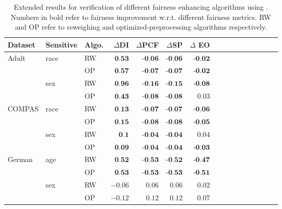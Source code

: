 	\begin{table}[!t]
	
	\centering
	\small
	\caption{Extended results for verification of different fairness enhancing algorithms using {\framework}. Numbers in bold refer to fairness improvement w.r.t. different fairness metrics. RW and OP refer to reweighing and optimized-preprocessing algorithms respectively.  }
	\label{fig:extended_verifying_fairness_algorithms}
	\setlength{\tabcolsep}{.5em}
	
	\begin{tabular}{lllrrrrrrrrrrrrr}
		
		\toprule
		Dataset & Sensitive & Algo. & $ \Delta $DI &  $ \Delta $PCF & $ \Delta $SP & $ \Delta$ EO\\
		\midrule
		
		
		\multirow{4}{*}{Adult}&\multirow{2}{*}{race}&RW&$ \textbf{0.53} $&$ \textbf{-0.06} $&$ \textbf{-0.06} $&$ \textbf{-0.02} $\\
		&&OP&$ \textbf{0.57} $&$ \textbf{-0.07} $&$ \textbf{-0.07} $&$ \textbf{-0.02} $\\
		\cmidrule{2-7}
		&\multirow{2}{*}{sex}&RW&$ \textbf{0.96} $&$ \textbf{-0.16} $&$ \textbf{-0.15} $&$ \textbf{-0.08} $\\
		&&OP&$ \textbf{0.43} $&$ \textbf{-0.08} $&$ \textbf{-0.08} $&$ 0.03 $\\
		
		\midrule
		\multirow{4}{*}{COMPAS}&\multirow{2}{*}{race}&RW&$ \textbf{0.13} $&$ \textbf{-0.07} $&$ \textbf{-0.07} $&$ \textbf{-0.06} $\\
		&&OP&$ \textbf{0.15} $&$ \textbf{-0.08} $&$ \textbf{-0.08} $&$ \textbf{-0.05} $\\
		\cmidrule{2-7}
		&\multirow{2}{*}{sex}&RW&$ \textbf{0.1} $&$ \textbf{-0.04} $&$ \textbf{-0.04} $&$ 0.04 $\\
		&&OP&$ \textbf{0.09} $&$ \textbf{-0.04} $&$ \textbf{-0.04} $&$ \textbf{-0.03} $\\
		
		\midrule
		\multirow{4}{*}{German}&\multirow{2}{*}{age}&RW&$ \textbf{0.52} $&$ \textbf{-0.53} $&$ \textbf{-0.52} $&$ \textbf{-0.47} $\\
		&&OP&$ \textbf{0.53} $&$ \textbf{-0.53} $&$ \textbf{-0.53} $&$ \textbf{-0.51} $\\
		\cmidrule{2-7}
		&\multirow{2}{*}{sex}&RW&$ -0.06 $&$ 0.06 $&$ 0.06 $&$ 0.02 $\\
		&&OP&$ -0.12 $&$ 0.12 $&$ 0.12 $&$ 0.07 $\\
		
		
		\bottomrule
	\end{tabular}
\end{table}
	
